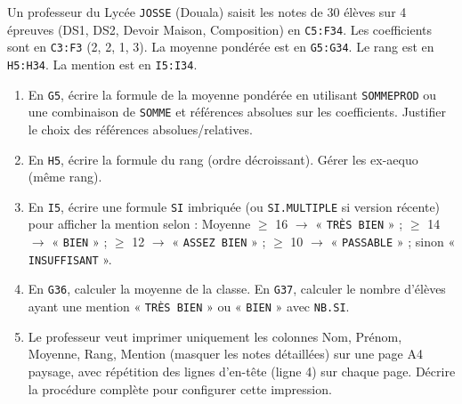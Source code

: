 \documentclass[11pt]{article}
\begin{document}
\begin{exercice}
Un professeur du Lycée \texttt{JOSSE} (Douala) saisit les notes de 30 élèves sur 4 épreuves (DS1, DS2, Devoir Maison, Composition) en \texttt{C5:F34}. Les coefficients sont en \texttt{C3:F3} (2, 2, 1, 3). La moyenne pondérée est en \texttt{G5:G34}. Le rang est en \texttt{H5:H34}. La mention est en \texttt{I5:I34}.
\begin{enumerate}
    \item En \texttt{G5}, écrire la formule de la moyenne pondérée en utilisant \texttt{SOMMEPROD} ou une combinaison de \texttt{SOMME} et références absolues sur les coefficients. Justifier le choix des références absolues/relatives.
    \item En \texttt{H5}, écrire la formule du rang (ordre décroissant). Gérer les ex-aequo (même rang).
    \item En \texttt{I5}, écrire une formule \texttt{SI} imbriquée (ou \texttt{SI.MULTIPLE} si version récente) pour afficher la mention selon : Moyenne $\ge$ 16 $\to$ « \texttt{TRÈS BIEN} » ; $\ge$ 14 $\to$ « \texttt{BIEN} » ; $\ge$ 12 $\to$ « \texttt{ASSEZ BIEN} » ; $\ge$ 10 $\to$ « \texttt{PASSABLE} » ; sinon « \texttt{INSUFFISANT} ».
    \item En \texttt{G36}, calculer la moyenne de la classe. En \texttt{G37}, calculer le nombre d'élèves ayant une mention « \texttt{TRÈS BIEN} » ou « \texttt{BIEN} » avec \texttt{NB.SI}.
    \item Le professeur veut imprimer uniquement les colonnes Nom, Prénom, Moyenne, Rang, Mention (masquer les notes détaillées) sur une page A4 paysage, avec répétition des lignes d'en-tête (ligne 4) sur chaque page. Décrire la procédure complète pour configurer cette impression.
\end{enumerate}
\end{exercice}
\end{document}
